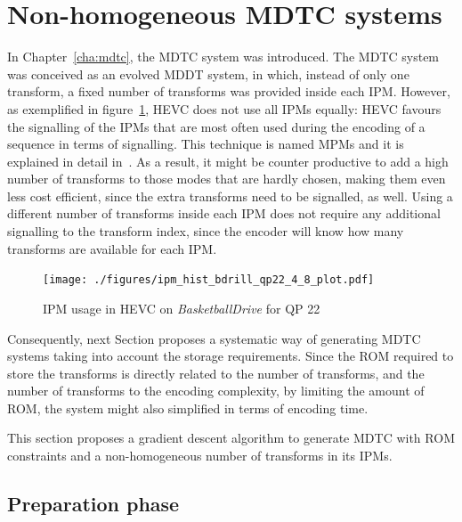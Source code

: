 \documentclass[11pt,a4paper,openright,twoside]{book}
\def\usepdfs{1} %
\numberwithin{equation}{section} %
\numberwithin{figure}{section} %
\numberwithin{table}{section} %
\begin{document}
\section{Non-homogeneous \acs{MDTC} systems}
\label{sec:non_homogeneous_mdtc_systems}

In Chapter~\ref{cha:mdtc}, the \ac{MDTC} system was introduced.
The \ac{MDTC} system was conceived as an evolved \ac{MDDT} system, in which,
instead of only one transform, a fixed number of transforms was provided
inside each \ac{IPM}.
However, as exemplified in figure~\ref{fig:hevc_ipm_usage}, \ac{HEVC} does not
use all \acp{IPM} equally:
\ac{HEVC} favours the signalling of the \acp{IPM} that are most often used
during the encoding of a sequence in terms of signalling.
This technique is named \acp{MPM} and it is explained in detail
in~\cite{wien-15-hevc}.
As a result, it might be counter productive to add a high number of transforms
to those modes that are hardly chosen, making them even less cost efficient,
since the extra transforms need to be signalled, as well.
Using a different number of transforms inside each \ac{IPM} does not require
any additional signalling to the transform index, since the encoder will know
how many transforms are available for each \ac{IPM}.

\begin{figure}[tb]
	\centering
	\ifthenelse{\usepdfs = 0}
	{}
	{\texttt{[image: ./figures/ipm\_hist\_bdrill\_qp22\_4\_8\_plot.pdf]}}
	\caption[\acs{IPM} usage in \acs{HEVC}]
	{\acs{IPM} usage in \acs{HEVC} on \emph{BasketballDrive} for \acs{QP} 22}
	\label{fig:hevc_ipm_usage}
\end{figure}

Consequently, next Section proposes a systematic way of generating \ac{MDTC}
systems taking into account the storage requirements.
Since the \acs{ROM} required to store the transforms is directly related to
the number of transforms, and the number of transforms to the encoding
complexity, by limiting the amount of \acs{ROM}, the system might also
simplified in terms of encoding time.

This section proposes a gradient descent algorithm to generate \ac{MDTC} with
\acs{ROM} constraints and a non-homogeneous number of transforms in its
\acp{IPM}.

\subsection{Preparation phase}
\label{sub:rw_preparation_phase}
\end{document}

